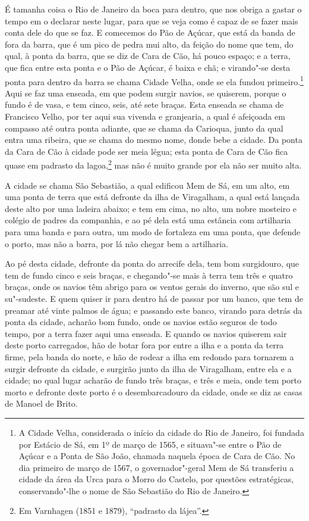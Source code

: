 É tamanha coisa o Rio de Janeiro da boca para dentro, que nos obriga a gastar o tempo em o
declarar neste lugar, para que se veja como é capaz de se fazer mais conta dele do que se
faz. E comecemos do Pão de Açúcar, que está da banda de fora da barra, que é um pico de
pedra mui alto, da feição do nome que tem, do qual, à ponta da barra, que se diz de Cara
de Cão, há pouco espaço; e a terra, que fica entre esta ponta e o Pão de Açúcar, é baixa e
chã; e virando"-se desta ponta para dentro da barra se chama Cidade Velha, onde se ela
fundou primeiro.\footnote{ A Cidade Velha, considerada o início da cidade do Rio de
Janeiro, foi fundada por Estácio de Sá, em 1º de março de 1565, e situava"-se entre o Pão
de Açúcar e a Ponta de São João, chamada naquela época de Cara de Cão. No dia primeiro de
março de 1567, o governador"-geral Mem de Sá transferiu a cidade da área da Urca para o
Morro do Castelo, por questões estratégicas, conservando"-lhe o nome de São Sebastião do
Rio de Janeiro.} Aqui se faz uma enseada, em que podem surgir navios, se quiserem, porque
o fundo é de vasa, e tem cinco, seis, até sete braças. Esta enseada se chama de Francisco
Velho, por ter aqui sua vivenda e granjearia, a qual é afeiçoada em compasso até outra
ponta adiante, que se chama da Carioqua, junto da qual entra uma ribeira, que se chama do
mesmo nome, donde bebe a cidade. Da ponta da Cara de Cão à cidade pode ser meia légua;
esta ponta de Cara de Cão fica quase em padrasto da lagoa,\footnote{ Em Varnhagen (1851 e
1879), ``padrasto da lájea''.} mas não é muito grande por ela não ser muito alta.

A cidade se chama São Sebastião, a qual edificou Mem de Sá, em um alto, em uma ponta de
terra que está defronte da ilha de Viragalham, a qual está lançada deste alto por uma
ladeira abaixo; e tem em cima, no alto, um nobre mosteiro e colégio de padres da
companhia, e ao pé dela está uma estância com artilharia para uma banda e para outra, um
modo de fortaleza em uma ponta, que defende o porto, mas não a barra, por lá não chegar
bem a artilharia.

Ao pé desta cidade, defronte da ponta do arrecife dela, tem bom surgidouro, que tem de
fundo cinco e seis braças, e chegando"-se mais à terra tem três e quatro braças, onde os
navios têm abrigo para os ventos gerais do inverno, que são sul e su"-sudeste. E quem
quiser ir para dentro há de passar por um banco, que tem de preamar até vinte palmos de
água; e passando este banco, virando para detrás da ponta da cidade, acharão bom fundo,
onde os navios estão seguros de todo tempo, por a terra fazer aqui uma enseada. E quando
os navios quiserem sair deste porto carregados, hão de botar fora por entre a ilha e a
ponta da terra firme, pela banda do norte, e hão de rodear a ilha em redondo para tornarem
a surgir defronte da cidade, e surgirão junto da ilha de Viragalham, entre ela e a cidade;
no qual lugar acharão de fundo três braças, e três e meia, onde tem porto morto e defronte
deste porto é o desembarcadouro da cidade, onde se diz as casas de Manoel de Brito.

